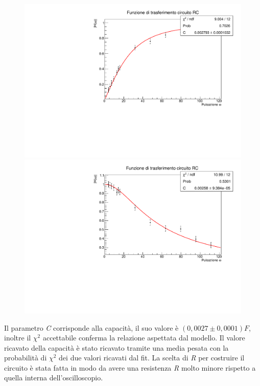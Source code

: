 \begin{figure}[H]
    \centering
    \includegraphics[scale=.4]{Immagini/trasferimento RC.pdf}
    \\
    \includegraphics[scale=.4]{Immagini/trasferimento RC 2.pdf}
    \caption{}
\end{figure}

Il parametro \textit{C} corrisponde alla capacità, il suo valore è $(0,0027 \pm 0,0001) F$, inoltre il $\chi ^{2}$ accettabile conferma la relazione aspettata dal modello. Il valore ricavato della capacità è stato ricavato tramite una media pesata con la probabilità di $\chi^2$ dei due valori ricavati dal fit.
La scelta di \textit{R} per costruire il circuito è stata fatta in modo da avere una resistenza \textit{R} molto minore rispetto a quella interna dell’oscilloscopio.


